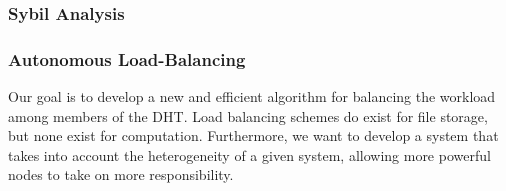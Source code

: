 \subsubsection{Sybil Analysis}




\subsubsection{Autonomous Load-Balancing}
Our goal is to develop a new and efficient algorithm for balancing the workload among members of the DHT.
Load balancing schemes do exist for file storage, but none exist for computation.
Furthermore, we want to develop a system that takes into account the heterogeneity of a given system, allowing more powerful nodes to take on more responsibility.







